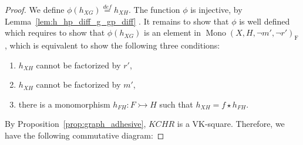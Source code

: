 \begin{proof}
       
        We define $\phi(h_{XG}) \overset{def}{=} h_{XH}$. The function $\phi$ is injective, by Lemma~\ref{lem:h_hp_diff_g_gp_diff} . It remains to show that $\phi$ is well defined which requires to show that $\phi(h_{XG})$ is an element in $\operatorname{Mono}(X,H,\lnot m', \lnot r')_{\operatorname{F}}$, which is equivalent to show the following three conditions:
        \begin{enumerate}
            \item $h_{XH}$ cannot be factorized by $r'$,
            \item $h_{XH}$ cannot be factorized by $m'$,
            \item there is a monomorphism $h_{FH} \mathop{\colon} F \rightarrowtail H$ such that $h_{XH} \mathop{=} f \mathop{\star} h_{FH}$.
        \end{enumerate}

        By Proposition~\ref{prop:graph_adhesive}, $KCHR$ is a VK-square. Therefore, we have the following commutative diagram:


\end{proof}
